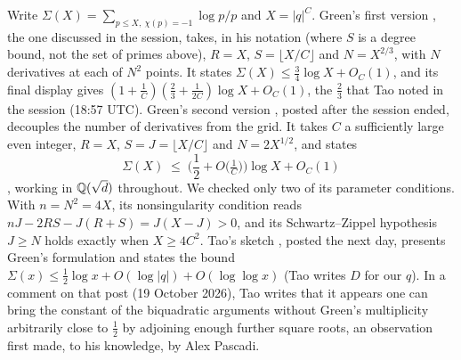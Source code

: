 \begin{remark}\label{rem:green}
Write $\Sigma(X) = \sum_{p\le X,\ \chi(p)=-1} \log p/p$ and $X = |q|^C$. Green's first version \cite{Green2026v1}, the one discussed in the session, takes, in his notation (where $S$ is a degree bound, not the set of primes above), $R = X$, $S = \lfloor X/C\rfloor$ and $N = X^{2/3}$, with $N$ derivatives at each of $N^2$ points. It states $\Sigma(X) \le \tfrac34\log X + O_C(1)$, and its final display gives $(1 + \tfrac1C)(\tfrac23 + \tfrac1{2C})\log X + O_C(1)$, the $\tfrac23$ that Tao noted in the session (18:57 UTC). Green's second version \cite{Green2026}, posted after the session ended, decouples the number of derivatives from the grid. It takes $C$ a sufficiently large even integer, $R = X$, $S = J = \lfloor X/C\rfloor$ and $N = 2X^{1/2}$, and states
\[
  \Sigma(X) \;\le\; \Big(\frac12 + O\big(\tfrac1C\big)\Big)\log X + O_C(1)
\]
\cite[Theorem~1.1]{Green2026}, working in $\mathbb{Q}(\sqrt d)$ throughout. We checked only two of its parameter conditions. With $n = N^2 = 4X$, its nonsingularity condition reads $nJ - 2RS - J(R+S) = J(X - J) > 0$, and its Schwartz--Zippel hypothesis $J \ge N$ holds exactly when $X \ge 4C^2$. Tao's sketch \cite{TaoSketch2026}, posted the next day, presents Green's formulation and states the bound $\Sigma(x) \le \tfrac12\log x + O(\log|q|) + O(\log\log x)$ (Tao writes $D$ for our $q$). In a comment on that post (19 October 2026), Tao writes that it appears one can bring the constant of the biquadratic arguments without Green's multiplicity arbitrarily close to $\tfrac12$ by adjoining enough further square roots, an observation first made, to his knowledge, by Alex Pascadi.
\end{remark}

